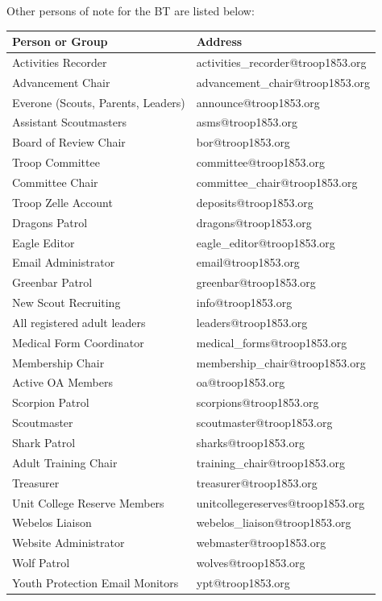 \documentclass{ltxguide}
\begin{document}
Other persons of note for the \ac{BT} are listed below:

\begin{tabular}{ l l }
	\textbf{Person or Group} & \textbf{Address} \\
	\hline
	Activities Recorder 				& activities\_recorder@troop1853.org \\
	Advancement Chair 					& advancement\_chair@troop1853.org \\
	Everone (Scouts, Parents, Leaders)	& announce@troop1853.org \\
	Assistant Scoutmasters				& asms@troop1853.org \\
	Board of Review Chair				& bor@troop1853.org \\
	Troop Committee						& committee@troop1853.org \\
	Committee Chair						& committee\_chair@troop1853.org \\
	Troop Zelle Account					& deposits@troop1853.org \\
	Dragons Patrol						& dragons@troop1853.org \\
	Eagle Editor						& eagle\_editor@troop1853.org \\
	Email Administrator					& email@troop1853.org \\
	Greenbar Patrol						& greenbar@troop1853.org \\
	New Scout Recruiting				& info@troop1853.org \\
	All registered adult leaders		& leaders@troop1853.org \\
	Medical Form Coordinator			& medical\_forms@troop1853.org \\
	Membership Chair					& membership\_chair@troop1853.org \\
	Active OA Members					& oa@troop1853.org \\
	Scorpion Patrol						& scorpions@troop1853.org \\
	Scoutmaster							& scoutmaster@troop1853.org \\
	Shark Patrol						& sharks@troop1853.org \\
	Adult Training Chair				& training\_chair@troop1853.org \\
	Treasurer							& treasurer@troop1853.org \\
	Unit College Reserve Members		& unitcollegereserves@troop1853.org \\
	Webelos Liaison						& webelos\_liaison@troop1853.org \\
	Website Administrator				& webmaster@troop1853.org \\
	Wolf Patrol							& wolves@troop1853.org \\
	Youth Protection Email Monitors		& ypt@troop1853.org \\
	\hline
\end{tabular}
\end{document}
